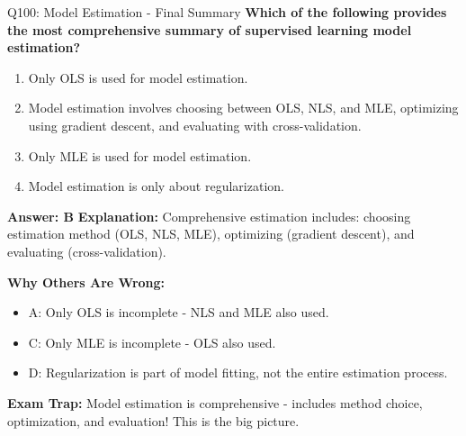 \documentclass[8pt]{beamer}
\begin{document}
	\begin{frame}{Q100: Model Estimation - Final Summary}
		\fontsize{6.5}{7.5}\selectfont
		\textbf{Which of the following provides the most comprehensive summary of supervised learning model estimation?}
		
		\begin{enumerate}
			\item Only OLS is used for model estimation.
			\item Model estimation involves choosing between OLS, NLS, and MLE, optimizing using gradient descent, and evaluating with cross-validation.
			\item Only MLE is used for model estimation.
			\item Model estimation is only about regularization.
		\end{enumerate}
		
		\vspace{0.05cm}
		\textcolor{myblue}{\textbf{Answer: B}}
		\vspace{0.05cm}
		\textcolor{myblue}{\textbf{Explanation:}} Comprehensive estimation includes: choosing estimation method (OLS, NLS, MLE), optimizing (gradient descent), and evaluating (cross-validation).
		
		\vspace{0.05cm}
		\textcolor{myred}{\textbf{Why Others Are Wrong:}}
		\begin{itemize}
			\item \textcolor{myred}{A:} Only OLS is incomplete - NLS and MLE also used.
			\item \textcolor{myred}{C:} Only MLE is incomplete - OLS also used.
			\item \textcolor{myred}{D:} Regularization is part of model fitting, not the entire estimation process.
		\end{itemize}
		
		\textcolor{myred}{\textbf{Exam Trap:}} Model estimation is \textcolor{myblue}{comprehensive} - includes method choice, optimization, and evaluation! This is the big picture.
	\end{frame}
	
	
\end{document}
